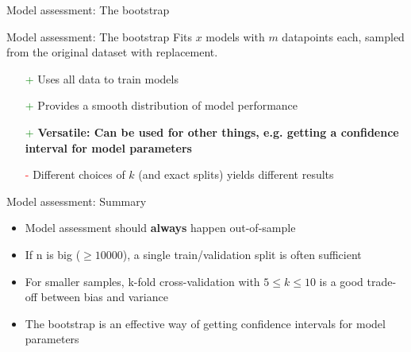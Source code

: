 \documentclass[10pt]{beamer}
\begin{document}
\begin{frame}{Model assessment: The bootstrap}
    \end{frame}

    \begin{frame}{Model assessment: The bootstrap} %
         Fits $x$ models with $m$ datapoints each, sampled from the original dataset with replacement.
        \begin{itemize}
            \item[\textcolor{green}{+}] Uses all data to train models
            \item[\textcolor{green}{+}] Provides a smooth distribution of model performance
            \item[\textcolor{green}{+}] \textbf{Versatile: Can be used for other things, e.g. getting a confidence interval for model parameters}
            \item[\textcolor{red}{-}] Different choices of $k$ (and exact splits) yields different results
        \end{itemize}
    \end{frame}

    \begin{frame}{Model assessment: Summary}
        \begin{itemize}
            \item Model assessment should \textbf{always} happen out-of-sample
            \item If n is big ($\geq 10000$), a single train/validation split is often sufficient
            \item For smaller samples, k-fold cross-validation with $5 \leq k \leq 10$ is a good trade-off between bias and variance
            \item The bootstrap is an effective way of getting confidence intervals for model parameters
        \end{itemize}
    \end{frame}
\end{document}
